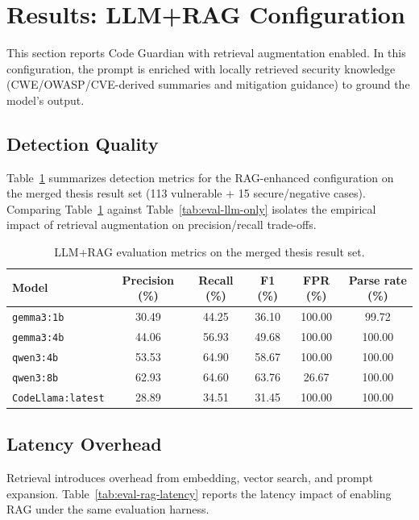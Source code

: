 \section{Results: LLM+RAG Configuration}
\label{sec:eval-rag}

This section reports Code Guardian with retrieval augmentation enabled. In this configuration, the prompt is enriched with locally retrieved security knowledge (CWE/OWASP/CVE-derived summaries and mitigation guidance) to ground the model’s output.

\subsection*{Detection Quality}

Table~\ref{tab:eval-rag} summarizes detection metrics for the RAG-enhanced configuration on the merged thesis result set (113 vulnerable + 15 secure/negative cases). Comparing Table~\ref{tab:eval-rag} against Table~\ref{tab:eval-llm-only} isolates the empirical impact of retrieval augmentation on precision/recall trade-offs.

\begin{table}[H]
  \centering
  \caption{LLM+RAG evaluation metrics on the merged thesis result set.}
  \label{tab:eval-rag}
  \small
  \begin{tabular}{lccccc}
    \toprule
    Model & Precision (\%) & Recall (\%) & F1 (\%) & FPR (\%) & Parse rate (\%) \\
    \midrule
    \texttt{gemma3:1b} & 30.49 & 44.25 & 36.10 & 100.00 & 99.72 \\
    \texttt{gemma3:4b} & 44.06 & 56.93 & 49.68 & 100.00 & 100.00 \\
    \texttt{qwen3:4b} & 53.53 & 64.90 & 58.67 & 100.00 & 100.00 \\
    \texttt{qwen3:8b} & 62.93 & 64.60 & 63.76 & 26.67 & 100.00 \\
    \texttt{CodeLlama:latest} & 28.89 & 34.51 & 31.45 & 100.00 & 100.00 \\
    \bottomrule
  \end{tabular}
\end{table}

\subsection*{Latency Overhead}

Retrieval introduces overhead from embedding, vector search, and prompt expansion. Table~\ref{tab:eval-rag-latency} reports the latency impact of enabling RAG under the same evaluation harness.

